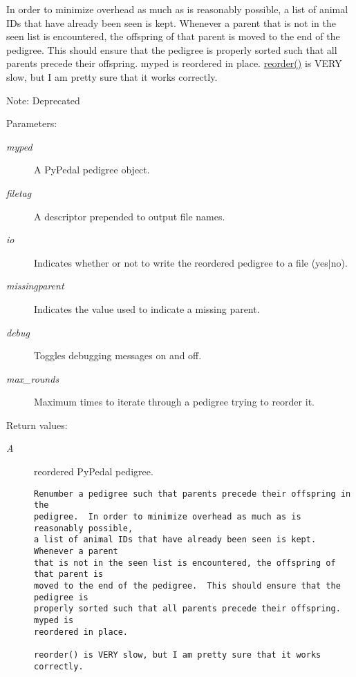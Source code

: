 In order to minimize overhead as much as is reasonably possible, a list of animal IDs that have already been seen is kept. Whenever a parent that is not in the seen list is encountered, the offspring of that parent is moved to the end of the pedigree. This should ensure that the pedigree is properly sorted such that all parents precede their offspring. myped is reordered in place. \hyperlink{namespacePyPedal_1_1pyp__utils_4f2970c4e64c0d473968daf16237536d}{reorder()} is VERY slow, but I am pretty sure that it works correctly. \begin{Desc}
\item[Note:]Deprecated \end{Desc}
\begin{Desc}
\item[Parameters:]
\begin{description}
\item[{\em myped}]A Py\-Pedal pedigree object. \item[{\em filetag}]A descriptor prepended to output file names. \item[{\em io}]Indicates whether or not to write the reordered pedigree to a file (yes$|$no). \item[{\em missingparent}]Indicates the value used to indicate a missing parent. \item[{\em debug}]Toggles debugging messages on and off. \item[{\em max\_\-rounds}]Maximum times to iterate through a pedigree trying to reorder it. \end{description}
\end{Desc}
\begin{Desc}
\item[Return values:]
\begin{description}
\item[{\em A}]reordered Py\-Pedal pedigree.

\footnotesize\begin{verbatim}Renumber a pedigree such that parents precede their offspring in the
pedigree.  In order to minimize overhead as much as is reasonably possible,
a list of animal IDs that have already been seen is kept.  Whenever a parent
that is not in the seen list is encountered, the offspring of that parent is
moved to the end of the pedigree.  This should ensure that the pedigree is
properly sorted such that all parents precede their offspring.  myped is
reordered in place.

reorder() is VERY slow, but I am pretty sure that it works correctly.
\end{verbatim}
\normalsize
 \end{description}
\end{Desc}


